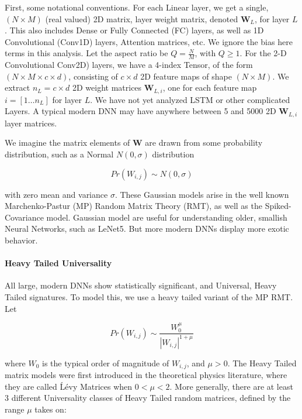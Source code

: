 
First, some notational conventions.
For each Linear layer, we get a  single, $(N\times M)$ (real valued) 2D matrix, layer weight matrix, denoted $\mathbf{W}_{L}$, for layer $L$.  
This also includes Dense or Fully Connected (FC) layers, as well as 1D Convolutional (Conv1D) layers, Attention matrices, etc.
We ignore the bias here terms in this analysis.  Let the aspect ratio be $Q=\frac{N}{M}$, with $Q\ge 1$.
For the 2-D Convolutional Conv2D) layers, we have a 4-index Tensor, of the form $(N\times M \times c\times d)$, consisting
of $c\times d$ 2D feature maps of shape $(N\times M)$.    
We  extract $n_{L}=c\times d$  2D  weight matrices $\mathbf{W}_{L,i}$, one for each feature map $i=[1\dots n_{L}]$ for layer $L$.
We have not yet analyzed LSTM or other complicated Layers. 
A typical modern DNN may have anywhere between 5 and 5000 2D $\mathbf{W}_{L,i}$ layer matrices.
   
We imagine the matrix elements of $\mathbf{W}$  are drawn from some probability distribution, such as a Normal $N(0,\sigma)$ distribution

$$Pr(W_{i,j})\sim N(0,\sigma)$$

with zero mean and variance $\sigma$.  These Gaussian models arise in the well known Marchenko-Pastur (MP) Random Matrix Theory (RMT),
as well as the Spiked-Covariance model. Gaussian model are useful for understanding older, smallish Neural Networks, such as LeNet5.
But more modern DNNs display more exotic behavior.  

\paragraph{Heavy Tailed Universality} All large, modern DNNs show statistically significant, and Universal, Heavy Tailed signatures.  
To model this, we use a heavy tailed variant of the MP RMT.  Let 

$$Pr(W_{i,j})\sim\dfrac{W_{0}^{\mu}}{|W_{i,j}|^{1+\mu}}$$

where $W_{0}$ is the typical order of magnitude of $W_{i,j}$, and $\mu>0$. The Heavy Tailed matrix models were first introduced
in the theoretical physics literature, where they are called \'L\'evy Matrices when $0<\mu<2$\cite{bouchaud1994}.
More generally, there are at least 3 different Universality classes of Heavy Tailed random matrices, defined by the range $\mu$ takes on:

